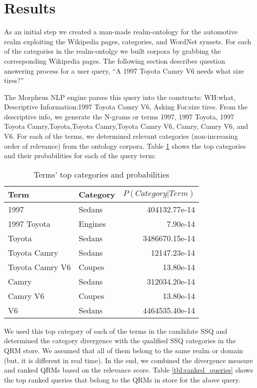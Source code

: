 \section{Results}
\label{sec:results}


As an initial step we created a man-made realm-ontology for the automotive realm
 exploiting the Wikipedia pages, categories, and WordNet synsets. For each of
the categories in the realm-ontolgy we built corpora by grabbing the
corresponding Wikipedia pages. The following section describes question
answering process for a user query, ``A 1997 Toyota Camry V6 needs what size
tires?''

The Morpheus NLP engine parses this query into the constructs: WH:what,
Descriptive Information:1997 Toyota Camry V6, Asking For:size tires. From the
descriptive info, we generate the N-grams or terms 1997, 1997 Toyota, 1997
Toyota Camry,Toyota,Toyota Camry,Toyota Camry V6, Camry, Camry V6, and V6. For
each of the terms, we determined relevant categories (non-increasing order of
relevance) from the ontology corpora. Table \ref{tbl:term_categories} shows
the top categories and their probabilities for each of the query term: 

\begin{table}[h]\footnotesize

\begin{tabular}{| p{3.2cm} | l | r |}
\hline 
Term & Category & $P(Category|Term)$ \\ \hline
1997 & Sedans & 404132.77e-14\\ 
1997 Toyota & Engines & 7.90e-14\\ 
Toyota  & Sedans & 3486670.15e-14\\ 
Toyota Camry & Sedans & 12147.23e-14\\ 
Toyota Camry V6 & Coupes & 13.80e-14\\ 
Camry & Sedans & 312034.20e-14\\ 
Camry V6 & Coupes & 13.80e-14\\ 
V6 & Sedans & 4464535.40e-14\\ \hline
\end{tabular}        

\caption{Terms' top categories and probabilities}
\label{tbl:term_categories}   

\end{table}

We used this top category of each of the terms in the candidate SSQ and
determined the category divergence with the qualified SSQ categories in the QRM
store. We assumed that all of them belong to the same realm or domain (but, it
is different in real time). In the end, we combined the divergence measure and
ranked QRMs based on the relevance score. Table \ref{tbl:ranked_queries}
shows the top ranked queries that belong to the QRMs in store for the above
query.

